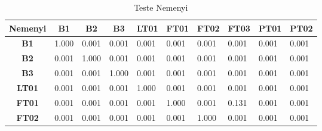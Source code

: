 \begin{table}[!htb]
	\centering
	\caption{Teste Nemenyi}\label{tb:nemeyi}
	\begin{tabular}{@{}clllllllll@{}}
		\toprule
		\multicolumn{1}{l}{\textbf{Nemenyi}} & \multicolumn{1}{c}{\textbf{B1}} & \multicolumn{1}{c}{\textbf{B2}} & \multicolumn{1}{c}{\textbf{B3}} & \multicolumn{1}{c}{\textbf{LT01}} & \multicolumn{1}{c}{\textbf{FT01}} & \multicolumn{1}{c}{\textbf{FT02}} & \multicolumn{1}{c}{\textbf{FT03}} & \multicolumn{1}{c}{\textbf{PT01}} & \multicolumn{1}{c}{\textbf{PT02}} \\ \midrule
		\textbf{B1}                         & 1.000                          & 0.001                          & 0.001                          & 0.001                          & 0.001                          & 0.001                          & 0.001                          & 0.001                          & 0.001                          \\
		\textbf{B2}                         & 0.001                          & 1.000                          & 0.001                          & 0.001                          & 0.001                          & 0.001                          & 0.001                          & 0.001                          & 0.001                          \\
		\textbf{B3}                         & 0.001                          & 0.001                          & 1.000                          & 0.001                          & 0.001                          & 0.001                          & 0.001                          & 0.001                          & 0.001                          \\
		\textbf{LT01}                       & 0.001                          & 0.001                          & 0.001                          & 1.000                          & 0.001                          & 0.001                          & 0.001                          & 0.001                          & 0.001                          \\
		\textbf{FT01}                       & 0.001                          & 0.001                          & 0.001                          & 0.001                          & 1.000                          & 0.001                          & 0.131                          & 0.001                          & 0.001                          \\
		\textbf{FT02}                       & 0.001                          & 0.001                          & 0.001                          & 0.001                          & 0.001                          & 1.000                          & 0.001                          & 0.001                          & 0.001                          \\

\end{tabular}
\end{table}
